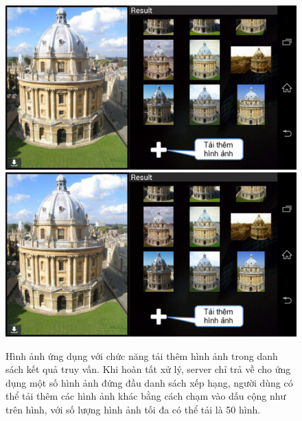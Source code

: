\begin{figure}[!htbp]
  \begin{center}
    \leavevmode
    \ifpdf
      \includegraphics[scale=0.35]{interface_5}
    \else
      \includegraphics[scale=0.35]{interface_5}
    \fi
    \caption[Hình ảnh ứng dụng với chức năng tải thêm hình ảnh trong danh sách kết quả]{Hình ảnh ứng dụng với chức năng tải thêm hình ảnh trong danh sách kết quả truy vấn. Khi hoàn tất xử lý, server chỉ trả về cho ứng dụng một số hình ảnh đứng đầu danh sách xếp hạng, người dùng có thể tải thêm các hình ảnh khác bằng cách chạm vào dấu cộng như trên hình, với số lượng hình ảnh tối đa có thể tải là 50 hình.}
    \label{FigInterface5}
  \end{center}
\end{figure}

